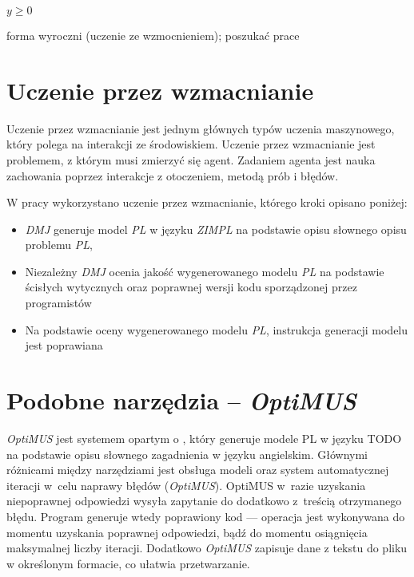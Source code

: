     $y \geq 0$

forma wyroczni (uczenie ze wzmocnieniem); poszukać prace

\section{Uczenie przez wzmacnianie}
Uczenie przez wzmacnianie jest jednym głównych typów uczenia maszynowego, który polega na interakcji ze środowiskiem. Uczenie przez wzmacnianie jest problemem, z którym musi zmierzyć się agent. Zadaniem agenta jest nauka zachowania poprzez interakcje z otoczeniem, metodą prób i błędów.\cite{kaelbling1996reinforcement}

W pracy wykorzystano uczenie przez wzmacnianie, którego kroki opisano poniżej:
\begin{itemize}
    \item \textit{DMJ} generuje model \textit{PL} w języku \textit{ZIMPL} na podstawie opisu słownego opisu problemu \textit{PL},
    \item Niezależny \textit{DMJ} ocenia jakość wygenerowanego modelu \textit{PL} na podstawie ścisłych wytycznych oraz poprawnej wersji kodu sporządzonej przez programistów
    \item Na podstawie oceny wygenerowanego modelu \textit{PL}, instrukcja generacji modelu jest poprawiana
\end{itemize}

\section{Podobne narzędzia -- \textit{OptiMUS}} \label{sec:optimus}

\textit{OptiMUS} \cite{ahmaditeshnizi2023optimus} jest systemem opartym o , który generuje modele PL w języku TODO na podstawie opisu słownego zagadnienia w języku angielskim. %
Głównymi różnicami między narzędziami jest obsługa modeli  oraz system automatycznej iteracji w~celu naprawy błędów (\textit{OptiMUS}). %
OptiMUS w~razie uzyskania niepoprawnej odpowiedzi wysyła zapytanie do  dodatkowo z~treścią otrzymanego błędu. %
Program generuje wtedy poprawiony kod --- operacja jest wykonywana do momentu uzyskania poprawnej odpowiedzi, bądź do momentu osiągnięcia maksymalnej liczby iteracji. Dodatkowo \textit{OptiMUS} zapisuje dane z tekstu do pliku w określonym formacie, co ułatwia przetwarzanie. %



